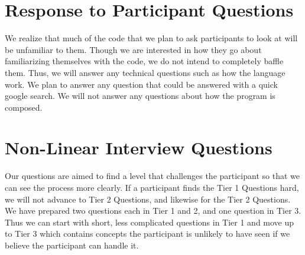 \documentclass{article}
\begin{document}
\section{Response to Participant Questions}
We realize that much of the code that we plan to ask participants to look at will be unfamiliar to them. Though we are interested in how they go about familiarizing themselves with the code, we do not intend to completely baffle them. Thus, we will answer any technical questions such as how the language work. We plan to answer any question that could be answered with a quick google search. We will not answer any questions about how the program is composed.



\section{Non-Linear Interview Questions}
Our questions are aimed to find a level that challenges the participant so that we can see the process more clearly. If a participant finds the Tier 1 Questions hard, we will not advance to Tier 2 Questions, and likewise for the Tier 2 Questions. We have prepared two questions each in Tier 1 and 2, and one question in Tier 3. Thus we can start with short, less complicated questions in Tier 1 and move up to Tier 3 which contains concepts the participant is unlikely to have seen if we believe the participant can handle it.
\end{document}
